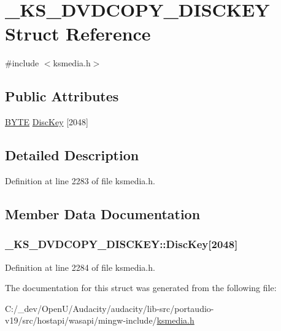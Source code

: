 \hypertarget{struct___k_s___d_v_d_c_o_p_y___d_i_s_c_k_e_y}{}\section{\+\_\+\+K\+S\+\_\+\+D\+V\+D\+C\+O\+P\+Y\+\_\+\+D\+I\+S\+C\+K\+EY Struct Reference}
\label{struct___k_s___d_v_d_c_o_p_y___d_i_s_c_k_e_y}


{\ttfamily \#include $<$ksmedia.\+h$>$}

\subsection*{Public Attributes}
\begin{DoxyCompactItemize}
\item 
\hyperlink{mapinls_8h_a4ae1dab0fb4b072a66584546209e7d58}{B\+Y\+TE} \hyperlink{struct___k_s___d_v_d_c_o_p_y___d_i_s_c_k_e_y_a8a78a2ad4bffc6ec50acad4463f14cb4}{Disc\+Key} \mbox{[}2048\mbox{]}
\end{DoxyCompactItemize}


\subsection{Detailed Description}


Definition at line 2283 of file ksmedia.\+h.



\subsection{Member Data Documentation}
\subsubsection[{\texorpdfstring{Disc\+Key}{DiscKey}}]{ \+\_\+\+K\+S\+\_\+\+D\+V\+D\+C\+O\+P\+Y\+\_\+\+D\+I\+S\+C\+K\+E\+Y\+::\+Disc\+Key\mbox{[}2048\mbox{]}}\hypertarget{struct___k_s___d_v_d_c_o_p_y___d_i_s_c_k_e_y_a8a78a2ad4bffc6ec50acad4463f14cb4}{}\label{struct___k_s___d_v_d_c_o_p_y___d_i_s_c_k_e_y_a8a78a2ad4bffc6ec50acad4463f14cb4}


Definition at line 2284 of file ksmedia.\+h.



The documentation for this struct was generated from the following file\+:\begin{DoxyCompactItemize}
\item 
C\+:/\+\_\+dev/\+Open\+U/\+Audacity/audacity/lib-\/src/portaudio-\/v19/src/hostapi/wasapi/mingw-\/include/\hyperlink{ksmedia_8h}{ksmedia.\+h}\end{DoxyCompactItemize}
